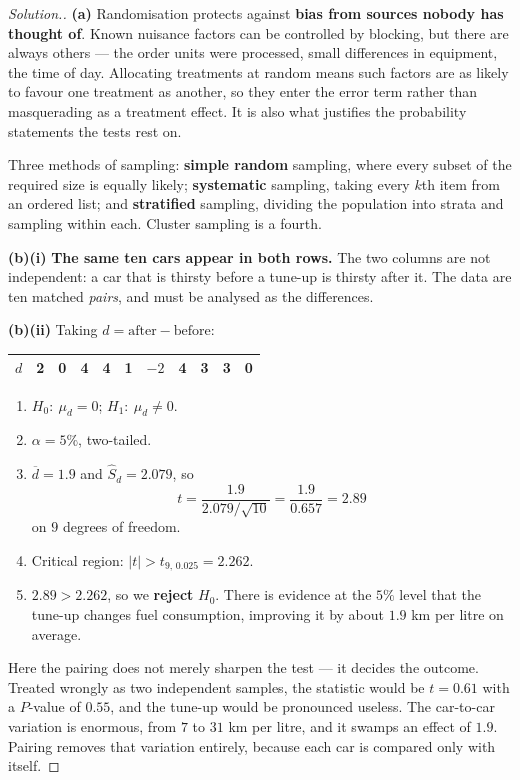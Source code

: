 \documentclass[11pt,a4paper]{article}
\theoremstyle{definition}
\newenvironment{solution}
  {\renewcommand{\qedsymbol}{}\begin{proof}[\textit{Solution}.]}
  {\end{proof}}
\begin{document}
\begin{solution}
\textbf{(a)} Randomisation protects against \textbf{bias from sources nobody has thought of}.
Known nuisance factors can be controlled by blocking, but there are always others --- the
order units were processed, small differences in equipment, the time of day. Allocating
treatments at random means such factors are as likely to favour one treatment as another, so
they enter the error term rather than masquerading as a treatment effect. It is also what
justifies the probability statements the tests rest on.

Three methods of sampling: \textbf{simple random} sampling, where every subset of the required
size is equally likely; \textbf{systematic} sampling, taking every $k$th item from an ordered
list; and \textbf{stratified} sampling, dividing the population into strata and sampling
within each. Cluster sampling is a fourth.

\textbf{(b)(i)} \textbf{The same ten cars appear in both rows.} The two columns are not
independent: a car that is thirsty before a tune-up is thirsty after it. The data are ten
matched \emph{pairs}, and must be analysed as the differences.

\textbf{(b)(ii)} Taking $d=\text{after}-\text{before}$:
\begin{table}[H]
\centering
\begin{tabular}{|l|c|c|c|c|c|c|c|c|c|c|}
\hline
$d$ & 2 & 0 & 4 & 4 & 1 & $-2$ & 4 & 3 & 3 & 0\\
\hline
\end{tabular}
\end{table}
\begin{enumerate}
\item $H_0:\ \mu_d=0$; $H_1:\ \mu_d\neq 0$.
\item $\alpha=5\%$, two-tailed.
\item $\overline{d}=1.9$ and $\widehat{S}_d=2.079$, so
\[t=\frac{1.9}{2.079/\sqrt{10}}=\frac{1.9}{0.657}=2.89\]
on $9$ degrees of freedom.
\item Critical region: $|t|>t_{9,\,0.025}=2.262$.
\item $2.89>2.262$, so we \textbf{reject} $H_0$. There is evidence at the $5\%$ level that the
tune-up changes fuel consumption, improving it by about $1.9$ km per litre on average.
\end{enumerate}

Here the pairing does not merely sharpen the test --- it decides the outcome. Treated wrongly
as two independent samples, the statistic would be $t=0.61$ with a $P$-value of $0.55$, and
the tune-up would be pronounced useless. The car-to-car variation is enormous, from $7$ to
$31$ km per litre, and it swamps an effect of $1.9$. Pairing removes that variation entirely,
because each car is compared only with itself.
\end{solution}
\end{document}
